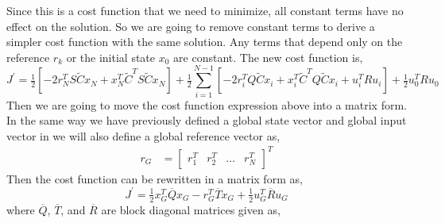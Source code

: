 \documentclass{article}
\newcommand{\doublebar}[1]{\overline{#1}}
\begin{document}
Since this is a cost function that we need to minimize, all constant terms have no effect on the solution. So we are
going to remove constant terms to derive a simpler cost function with the same solution. Any terms that depend only on
the reference $r_k$ or the initial state $x_0$ are constant. The new cost function is,
\begin{equation}
    J^\prime = \tfrac{1}{2}\left[- 2r_N^TS\tilde{C}x_N + x_N^T\tilde{C}^TS\tilde{C}x_N\right]
        + \tfrac{1}{2}\sum_{i=1}^{N-1}\left[
        - 2r_i^TQ\tilde{C}x_i + x_i^T\tilde{C}^TQ\tilde{C}x_i
        + u_i^TRu_i \right]
    + \tfrac{1}{2}u_0^TRu_0
\end{equation}
Then we are going to move the cost function expression above into a matrix form. In the same way we have previously
defined a global state vector and global input vector in  we will also
define a global reference vector as,
\begin{align}
    r_G &= \begin{bmatrix} r_1^T & r_2^T & \ldots & r_N^T \end{bmatrix}^T
\end{align}
Then the cost function can be rewritten in a matrix form as,
\begin{equation}
    J^\prime = \tfrac{1}{2}x_G^T \doublebar{Q} x_G - r_G^T\doublebar{T}x_G + \tfrac{1}{2}u_G^T\doublebar{R}u_G
\end{equation}
where $\doublebar{Q}$, $\doublebar{T}$, and $\doublebar{R}$ are block diagonal matrices given as,
\end{document}
